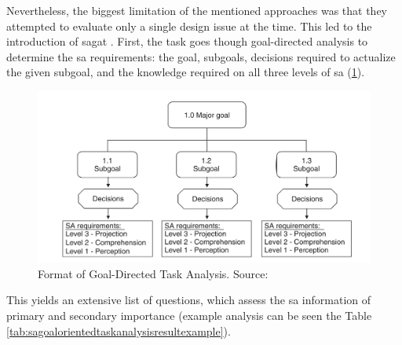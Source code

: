 Nevertheless, the biggest limitation of the mentioned approaches was that they attempted to evaluate only a single design issue at the time. This led \parencite{endsley_situation_1988} to the introduction of \gls{sagat} . First, the task goes though goal-directed analysis to determine the \gls{sa} requirements: the goal, subgoals, decisions required to actualize the given subgoal, and the knowledge required on all three levels of \gls{sa} (\ref{fig:sagoalorientedtaskanalysis}).
\begin{figure}
	\centering
	\includegraphics[width=0.7\linewidth]{figures/placeholders/SA_goal_oriented_task_analysis}
	\caption{Format of Goal-Directed Task Analysis. Source: \parencite{endsley_direct_nodate}}
	\label{fig:sagoalorientedtaskanalysis}
\end{figure}
This yields an extensive list of questions, which assess the \gls{sa} information of primary and secondary importance (example analysis can be seen the Table \ref{tab:sagoalorientedtaskanalysisresultexample}).
